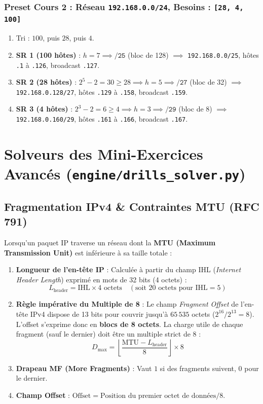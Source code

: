 \documentclass[11pt,a4paper]{report}
\begin{document}
\subsection{Preset Cours 2 : R\'eseau \texttt{192.168.0.0/24}, Besoins : \texttt{[28, 4, 100]}}
\begin{enumerate}
    \item Tri : $100$, puis $28$, puis $4$.
    \item \textbf{SR 1 (100 h\^otes)} : $h=7 \implies \texttt{/25}$ (bloc de 128) $\implies$ \texttt{192.168.0.0/25}, h\^otes \texttt{.1} \`a \texttt{.126}, broadcast \texttt{.127}.
    \item \textbf{SR 2 (28 h\^otes)} : $2^5 - 2 = 30 \ge 28 \implies h=5 \implies \texttt{/27}$ (bloc de 32) $\implies$ \texttt{192.168.0.128/27}, h\^otes \texttt{.129} \`a \texttt{.158}, broadcast \texttt{.159}.
    \item \textbf{SR 3 (4 h\^otes)} : $2^3 - 2 = 6 \ge 4 \implies h=3 \implies \texttt{/29}$ (bloc de 8) $\implies$ \texttt{192.168.0.160/29}, h\^otes \texttt{.161} \`a \texttt{.166}, broadcast \texttt{.167}.
\end{enumerate}

\chapter{Solveurs des Mini-Exercices Avanc\'es (\texttt{engine/drills\_solver.py})}

\section{Fragmentation IPv4 \& Contraintes MTU (RFC 791)}
Lorsqu'un paquet IP traverse un r\'eseau dont la \textbf{MTU (Maximum Transmission Unit)} est inf\'erieure \`a sa taille totale :
\begin{enumerate}
    \item \textbf{Longueur de l'en-t\^ete IP} : Calcul\'ee \`a partir du champ IHL (\textit{Internet Header Length}) exprim\'e en mots de 32 bits (4 octets) :
    $$L_{\text{header}} = \text{IHL} \times 4 \text{ octets} \quad (\text{soit } 20\text{ octets pour } \text{IHL}=5)$$
    \item \textbf{R\`egle imp\'erative du Multiple de 8} : Le champ \textit{Fragment Offset} de l'en-t\^ete IPv4 dispose de 13 bits pour couvrir jusqu'\`a $65\,535$ octets ($2^{16} / 2^{13} = 8$). L'offset s'exprime donc en \textbf{blocs de 8 octets}. La charge utile de chaque fragment (sauf le dernier) doit \^etre un multiple strict de 8 :
    $$D_{\max} = \left\lfloor \frac{\text{MTU} - L_{\text{header}}}{8} \right\rfloor \times 8$$
    \item \textbf{Drapeau MF (More Fragments)} : Vaut $1$ si des fragments suivent, $0$ pour le dernier.
    \item \textbf{Champ Offset} : $\text{Offset} = \text{Position du premier octet de donn\'ees} / 8$.
\end{enumerate}
\end{document}
